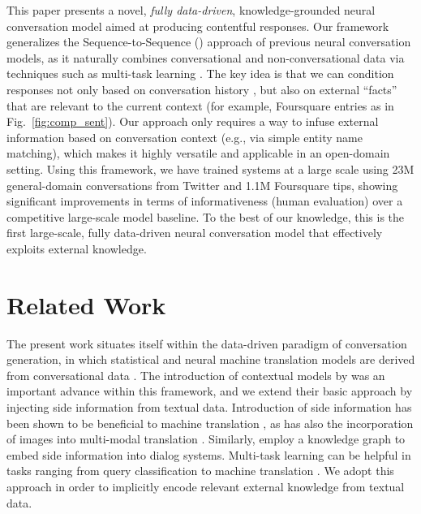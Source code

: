 \documentclass[letterpaper]{article}
\begin{document}
This paper presents a novel, {\it fully data-driven}, knowledge-grounded neural conversation model aimed at producing contentful responses. Our framework generalizes the Sequence-to-Sequence (\sts{}) approach \cite{hochreiter1997long,sutskever2014sequence} of previous neural conversation models, as it naturally combines conversational and non-conversational data via techniques such as multi-task learning \cite{Caruana:1997,liu-EtAl:2015}.
The key idea is that we can condition responses not only based on conversation history \cite{sordoni2015}, but also on external ``facts'' that are relevant to the current context (for example, Foursquare entries as in Fig.~\ref{fig:comp_sent}).
Our approach only requires a way to infuse external information based on conversation context (e.g., via simple entity name matching),
which makes it highly versatile and applicable in an open-domain setting.
Using this framework, we have trained systems at a large scale using 23M general-domain conversations from Twitter and 1.1M Foursquare tips, showing significant improvements in terms of informativeness (human evaluation) over a competitive large-scale \sts{} model baseline. To the best of our knowledge, this is the first large-scale, fully data-driven neural conversation model that effectively exploits external knowledge.

\section{Related Work}

The present work situates itself within the data-driven paradigm of conversation generation, in which statistical and neural machine translation models are derived from conversational data  \cite{ritter2011data,sordoni2015,serban2015hierarchical,shang2015neural,vinyals2015neural,li2016diversity}.
The introduction of contextual models by \cite{sordoni2015} was an important advance within this framework, and we extend their basic approach by injecting side information from textual data.
Introduction of side information has been shown to be beneficial to machine translation \cite{hoang2016incorporating}, as has also the incorporation of images into multi-modal translation \cite{huang2016attention,delbrouck2017visually}.
Similarly, \cite{HeHeP17-1162} employ a knowledge graph to embed side information into dialog systems.
Multi-task learning can be helpful in tasks ranging from query classification to machine translation \cite{Caruana:1997,dong2015multi,liu-EtAl:2015,luong2015multi}.
We adopt this approach in order to implicitly encode relevant external knowledge from textual data.
\end{document}
